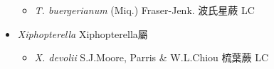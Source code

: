 \begin{itemize}
  \begin{itemize}
        \item[] \textit{T. buergerianum} (Miq.) Fraser-Jenk.  波氏星蕨   LC
  \end{itemize}
 \item[] \textit{Xiphopterella} Xiphopterella屬
                                
  \begin{itemize}
        \item[] \textit{X. devolii} S.J.Moore, Parris \& W.L.Chiou  梳葉蕨   LC
  \end{itemize}
  \end{itemize}
